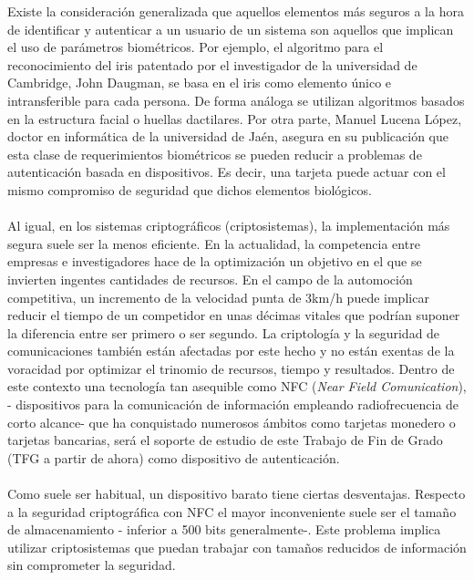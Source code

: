 \documentclass[../PFC.tex]{subfiles}
\begin{document}
Existe la consideración generalizada que aquellos elementos más seguros a la hora de identificar y autenticar a un usuario de un sistema son aquellos que implican el uso de parámetros biométricos. Por ejemplo, el algoritmo para el reconocimiento del iris patentado por el investigador de la universidad de Cambridge, John Daugman, se basa en el iris como elemento único e intransferible para cada persona\cite{ramli2008iris}. De forma análoga se utilizan algoritmos basados en la estructura facial o huellas dactilares. Por otra parte, Manuel Lucena López, doctor en informática de la universidad de Jaén, asegura en su publicación\cite{lucena} que esta clase de requerimientos biométricos se pueden reducir a problemas de autenticación basada en dispositivos. Es decir, una tarjeta puede actuar con el mismo compromiso de seguridad que dichos elementos biológicos.
\\\\
Al igual, en los sistemas criptográficos (criptosistemas), la implementación más segura suele ser la menos eficiente. En la actualidad, la competencia entre empresas e investigadores hace de la optimización un objetivo en el que se invierten ingentes cantidades de recursos. En el campo de la automoción competitiva, un incremento de la velocidad punta de 3km/h puede implicar reducir el tiempo de un competidor en unas décimas vitales que podrían suponer la diferencia entre ser primero o ser segundo. La criptología y la seguridad de comunicaciones también están afectadas por este hecho y no están exentas de la voracidad por optimizar el trinomio de recursos, tiempo y resultados. Dentro de este contexto una tecnología tan asequible como NFC (\textit{Near Field Comunication}), - dispositivos para la comunicación de información empleando radiofrecuencia de corto alcance- que ha conquistado numerosos ámbitos como tarjetas monedero o tarjetas bancarias, será el soporte de estudio de este Trabajo de Fin de Grado (TFG a partir de ahora) como dispositivo de autenticación.
\\\\
Como suele ser habitual, un dispositivo barato tiene ciertas desventajas. Respecto a la seguridad criptográfica con NFC el mayor inconveniente suele ser el tamaño de almacenamiento - inferior a 500 bits generalmente-. Este problema implica utilizar criptosistemas que puedan trabajar con tamaños reducidos de información sin comprometer la seguridad.
\\\\
\end{document}
